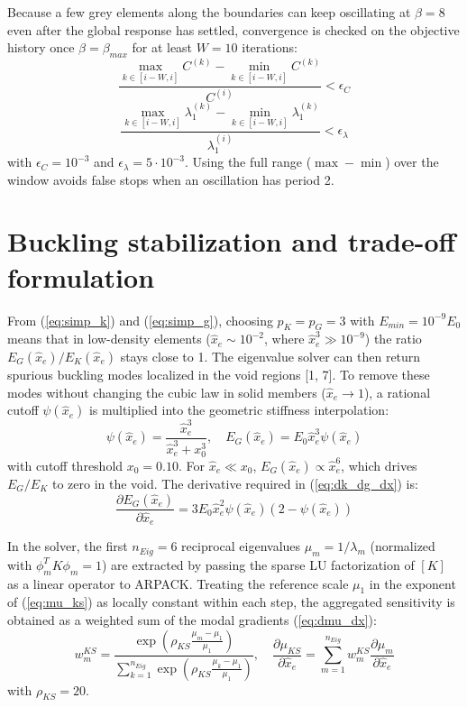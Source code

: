 \documentclass{article}
\begin{document}
Because a few grey elements along the boundaries can keep oscillating at $\beta = 8$ even after the global response has settled, convergence is checked on the objective history once $\beta = \beta_{max}$ for at least $W = 10$ iterations:
\begin{equation}\label{eq:conv_c}
\frac{\max_{k \in [i-W, i]} C^{(k)} - \min_{k \in [i-W, i]} C^{(k)}}{C^{(i)}} < \epsilon_C
\end{equation}
\begin{equation}\label{eq:conv_blf}
\frac{\max_{k \in [i-W, i]} \lambda_1^{(k)} - \min_{k \in [i-W, i]} \lambda_1^{(k)}}{\lambda_1^{(i)}} < \epsilon_\lambda
\end{equation}
with $\epsilon_C = 10^{-3}$ and $\epsilon_\lambda = 5 \cdot 10^{-3}$. Using the full range ($\max - \min$) over the window avoids false stops when an oscillation has period 2.

\section{Buckling stabilization and trade-off formulation}

\noindent From (\ref{eq:simp_k}) and (\ref{eq:simp_g}), choosing $p_K = p_G = 3$ with $E_{min} = 10^{-9}E_0$ means that in low-density elements ($\hat{x}_e \sim 10^{-2}$, where $\hat{x}_e^3 \gg 10^{-9}$) the ratio $E_G(\hat{x}_e)/E_K(\hat{x}_e)$ stays close to 1. The eigenvalue solver can then return spurious buckling modes localized in the void regions [1, 7]. To remove these modes without changing the cubic law in solid members ($\hat{x}_e \rightarrow 1$), a rational cutoff $\psi(\hat{x}_e)$ is multiplied into the geometric stiffness interpolation:
\begin{equation}\label{eq:eg_cutoff}
\psi(\hat{x}_e) = \frac{\hat{x}_e^3}{\hat{x}_e^3 + x_0^3}, \quad E_G(\hat{x}_e) = E_0 \hat{x}_e^3 \psi(\hat{x}_e)
\end{equation}
with cutoff threshold $x_0 = 0.10$. For $\hat{x}_e \ll x_0$, $E_G(\hat{x}_e) \propto \hat{x}_e^6$, which drives $E_G/E_K$ to zero in the void. The derivative required in (\ref{eq:dk_dg_dx}) is:
\begin{equation}\label{eq:deg_cutoff}
\frac{\partial E_G(\hat{x}_e)}{\partial \hat{x}_e} = 3 E_0 \hat{x}_e^2 \psi(\hat{x}_e)\left(2 - \psi(\hat{x}_e)\right)
\end{equation}

In the solver, the first $n_{Eig} = 6$ reciprocal eigenvalues $\mu_m = 1/\lambda_m$ (normalized with $\phi_m^T K \phi_m = 1$) are extracted by passing the sparse LU factorization of $[K]$ as a linear operator to ARPACK. Treating the reference scale $\mu_1$ in the exponent of (\ref{eq:mu_ks}) as locally constant within each step, the aggregated sensitivity is obtained as a weighted sum of the modal gradients (\ref{eq:dmu_dx}):
\begin{equation}\label{eq:ks_grad}
w_m^{KS} = \frac{\exp\left(\rho_{KS}\frac{\mu_m - \mu_1}{\mu_1}\right)}{\sum_{k=1}^{n_{Eig}} \exp\left(\rho_{KS}\frac{\mu_k - \mu_1}{\mu_1}\right)}, \quad \frac{\partial \mu_{KS}}{\partial \hat{x}_e} = \sum_{m=1}^{n_{Eig}} w_m^{KS} \frac{\partial \mu_m}{\partial \hat{x}_e}
\end{equation}
with $\rho_{KS} = 20$.
\end{document}
